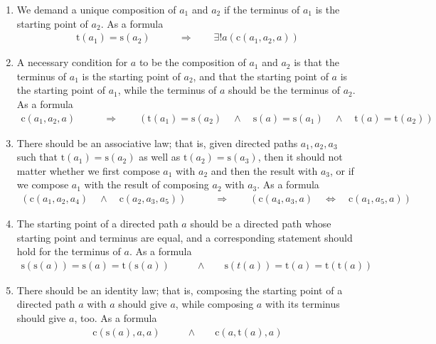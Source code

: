 \begin{enumerate}
\item[(CT1)]
We demand a unique composition of $a_{1}$ and $a_{2}$ if the terminus of $a_{1}$ is the starting point of $a_{2}$.
As a formula
\begin{align*}
  \mathrm{t}(a_{1})
  =
  \mathrm{s}(a_{2})
  \qquad
  &\Rightarrow
  \qquad
  \exists!
a
  \left(
    \mathrm{c}(a_{1},a_{2},a)
  \right)
\end{align*}
\item[(CT2)]
A necessary condition for $a$ to be the composition of $a_{1}$ and $a_{2}$ is that the terminus of $a_{1}$ is the starting point of $a_{2}$, and that the starting point of $a$ is the starting point of $a_{1}$, while the terminus of $a$ should be the terminus of $a_{2}$.
As a formula
\begin{align*}
  \mathrm{c}(a_{1},a_{2},a)
  \qquad
  &\Rightarrow
  \qquad
  \left(
    \mathrm{t}(a_{1})
    =
    \mathrm{s}(a_{2})
    \quad
    \land
    \quad
    \mathrm{s}(a)
    =
    \mathrm{s}(a_{1})
    \quad
    \land
    \quad
    \mathrm{t}(a)
    =
    \mathrm{t}(a_{2})
  \right)
\end{align*}
\item[(CT3)]
There should be an associative law; that is, given directed paths $a_{1},a_{2},a_{3}$ such that $\mathrm{t}(a_{1}) = \mathrm{s}(a_{2})$ as well as $\mathrm{t}(a_{2}) = \mathrm{s}(a_{3})$, then it should not matter whether we first compose $a_{1}$ with $a_{2}$ and then the result with $a_{3}$, or if we compose $a_{1}$ with the result of composing $a_{2}$ with $a_{3}$.
As a formula 
\begin{align*}
  \left(
    \mathrm{c}(a_{1},a_{2},a_{4})
    \quad
    \land
    \quad
    \mathrm{c}(a_{2},a_{3},a_{5})
  \right)
  \qquad
  &\Rightarrow
  \qquad
  \left(
    \mathrm{c}(a_{4},a_{3},a)
    \quad
    \Leftrightarrow
    \quad
    \mathrm{c}(a_{1},a_{5},a)
  \right)
\end{align*}
\item[(CT4)]
The starting point of a directed path $a$ should be a directed path whose starting point and terminus are equal, and a corresponding statement should hold for the terminus of $a$.
As a formula
\begin{align*}
  \mathrm{s}(\mathrm{s}(a))
  =
  \mathrm{s}(a)
  =
  \mathrm{t}(\mathrm{s}(a))
  \qquad
  &\land
  \qquad
  \mathrm{s}(t(a))
  =
  \mathrm{t}(a)
  =
  \mathrm{t}(\mathrm{t}(a))
\end{align*}

\item[(CT5)]
There should be an identity law; that is, composing the starting point of a directed path $a$ with $a$ should give $a$, while composing $a$ with its terminus should give $a$, too.
As a formula
\begin{align*}
  \mathrm{c}(\mathrm{s}(a),a,a)
  \qquad
  &\land
  \qquad
  \mathrm{c}(a,\mathrm{t}(a),a)
\end{align*}
\end{enumerate}
